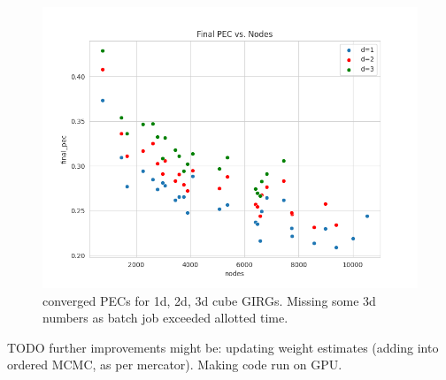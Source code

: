 \begin{figure}
  \centering
  \includegraphics[width=\textwidth]{figures/mcmc_ordered_final_pec.png}
  \caption{converged PECs for 1d, 2d, 3d cube GIRGs. Missing some 3d numbers
  as batch job exceeded allotted time.}
  \label{fig:converged_pecs}
\end{figure}


TODO further improvements might be: updating weight estimates (adding into ordered MCMC, as per mercator). Making code run on GPU.








